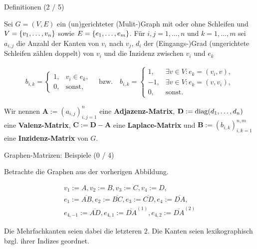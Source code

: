 \documentclass[aspectratio=169]{beamer}
\begin{document}
\begin{frame}{Definitionen (2 / 5)}
  
  \begin{definition*}
    Sei $G = (V, E)$ ein (un)gerichteter (Mulit-)Graph mit oder ohne Schleifen und $V = {\left \{ v_1, \dots, v_n \right \}}$ sowie $E = {\left \{ e_1, \dots, e_m \right \}}$.
    Für $i, j = 1, \dots, n$ und $k = 1, \dots, m$ sei $a_{i, j}$ die Anzahl der Kanten von $v_i$ nach $v_j$, $d_i$ der (Eingangs-)Grad (ungerichtete Schleifen zählen doppelt) von $v_i$ und die Inzidenz zwischen $v_i$ und $e_k$

    \begin{align*}
      b_{i, k}
      =
      \begin{cases}
        1, & v_i \in e_k, \\
        0, & \text{sonst},
      \end{cases}
      \quad
      \text{bzw.}
      \quad
      b_{i, k}
      =
      \begin{cases}
        1, & \exists v \in V: e_k = (v_i, v), \\
       -1, & \exists v \in V: e_k = (v, v_i), \\
        0, & \text{sonst}.
      \end{cases}
    \end{align*}

    Wir nennen $\mathbf A := (a_{i, j})_{i,j=1}^n$ eine \textbf{Adjazenz-Matrix}, $\mathbf D := \operatorname{diag}(d_1, \dots, d_n)$ eine \textbf{Valenz-Matrix}, $\mathbf C := \mathbf D - \mathbf A$ eine \textbf{Laplace-Matrix} und $\mathbf B := (b_{i, k})_{i,k=1}^{n, m}$ eine \textbf{Inzidenz-Matrix} von $G$.

  \end{definition*}
  
\end{frame}

\begin{frame}{Graphen-Matrizen: Beispiele (0 / 4)}

  Betrachte die Graphen aus der vorherigen Abbildung.

  \begin{gather*}
    v_1 := A, v_2 := B, v_3 := C, v_4 := D, \\
    e_1 := \overline{A B},
    e_2 := \overline{B C},
    e_3 := \overline{C D},
    e_4 := \overline{D A}, \\
    e_{4, -1} := \overline{A D},
    e_{4, 1} := \overline{D A}^{(1)},
    e_{4, 2} := \overline{D A}^{(2)}
  \end{gather*}

  Die Mehrfachkanten seien dabei die letzteren $2$.
  Die Kanten seien lexikographisch bzgl. ihrer Indizes geordnet.

\end{frame}
\end{document}
